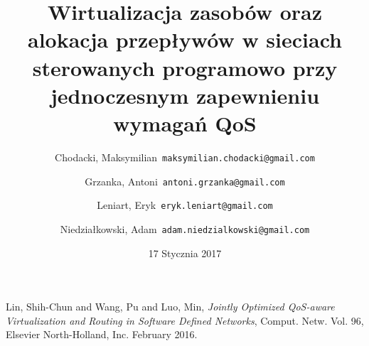 \documentclass{article}
\title{Wirtualizacja zasobów oraz alokacja przepływów w sieciach sterowanych programowo przy jednoczesnym zapewnieniu wymagań QoS}
\author{
  Chodacki, Maksymilian\      \texttt{maksymilian.chodacki@gmail.com}
  \and
  Grzanka, Antoni\      \texttt{antoni.grzanka@gmail.com}
  \and
  Leniart, Eryk\      \texttt{eryk.leniart@gmail.com}
  \and
  Niedziałkowski, Adam\      \texttt{adam.niedzialkowski@gmail.com}
}
\date{17 Stycznia 2017}
\begin{document}
\maketitle










\begin{thebibliography}

  Lin, Shih-Chun and Wang, Pu and Luo, Min,
  \emph{Jointly Optimized QoS-aware Virtualization and Routing in Software Defined Networks},
  Comput. Netw. Vol. 96,
  Elsevier North-Holland, Inc.
  February 2016.

\end{thebibliography}
\end{document}
